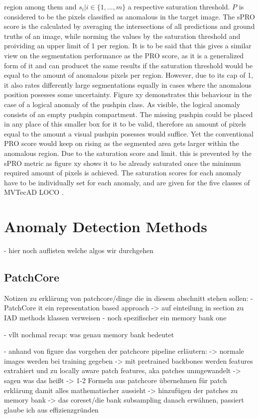 region among them and $s_i | i \in \{1, ... , m\}$ a respective saturation threshold. $P$ is considered to be the pixels classified as anomalous 
in the target image. The sPRO score is the calculated by averaging the intersections of all predictions and ground truths of an image, 
while norming the values by the saturation threshold and proividing an upper limit of 1 per region. It is to be said that this gives a similar 
view on the segmentation performance as the PRO score, as it is a generalized form of it and can producet the same results if the saturation 
threshold would be equal to the amount of anomalous pixels per region. However, due to its cap of 1, it also rates differently large segmentations equally in cases 
where the anomalous position posesses some uncertainty. Figure xy demonstrates this behaviour in the case of a logical anomaly of the pushpin class. 
As visible, the logical anomaly consists of an empty pushpin compartment. The missing pushpin could be placed in any place of this smaller 
box for it to be valid, therefore an amount of pixels equal to the amount a visual pushpin posesses would suffice. Yet the conventional PRO score 
would keep on rising as the segmented area gets larger within the anomalous region. Due to the saturation score and limit. this is prevented 
by the sPRO metric as figure xy shows it to be already saturated once the minimum required amount of pixels is achieved. The saturation 
scores for each anomaly have to be individually set for each anomaly, and are given for the five classes of MVTecAD LOCO \cite{LOCODentsAndScratchesBergmann2022}.



\section{Anomaly Detection Methods}
\label{sec:IADmethods}
- hier noch auflisten welche algos wir durchgehen


\subsection{PatchCore}
\label{subsec:patchcore}
Notizen zu erklärung von patchcore/dinge die in diesem abschnitt stehen sollen:
- PatchCore it ein representation based approach -> auf einteilung in section zu IAD methods klassen verweisen
- noch spezifischer ein memory bank one

- vllt nochmal recap: was genau memory bank bedeutet

- anhand von figure das vorgehen der patchcore pipeline erläutern:
-> normale images werden bei training gegeben
-> mit pretrained backbones werden features extrahiert und zu locally aware patch features, aka patches unmgewandelt -> sagen was das heißt
-> 1-2 Formeln aus patchcore übernehmen für patch erklärung damit alles mathematischer aussieht
-> hinzufügen der patches zu memory bank
-> das coreset/die bank subsampling danach erwähnen, passiert glaube ich aus effizienzgründen

